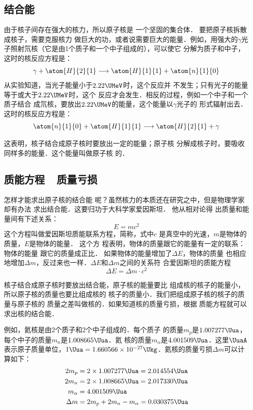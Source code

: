\subsection{结合能}

由于核子间存在强大的核力，所以原子核是
一个坚固的集合体．
要把原子核拆散成核子，需要克服核力
做巨大的功，或者说需要巨大的能量．例如，用强大的$\gamma$光
子照射氘核（它是由1个质子和一个中子组成的），可以使它
分解为质子和中子，这时的核反应方程是：
\[\gamma +\atom{H}{2}{1}\longrightarrow \atom{H}{1}{1}+\atom{n}{1}{0} \]
从实验知道，当光子能量小于$2.22\UMeV$时，这个反应并
不发生；只有光子的能量等于或大于$2.22\UMeV$时，这个
反应才会发生．相反的过程，例如一个中子和一个质子结合
成氘核，要放出$2.22\UMeV$的能量，这个能量以$\gamma$光子的
形式辐射出去．这时的核反应方程是：
\[\atom{n}{1}{0}+ \atom{H}{1}{1}\longrightarrow \atom{H}{2}{1} +\gamma  \]

这表明，核子结合成原子核时要放出一定的能量；原子核
分解成核子时，要吸收同样多的能量．这个能量叫做原子核
的．

\subsection{质能方程~~质量亏损}

怎样才能求出原子核的结合能
呢？虽然核力的本质还在研究之中，但是物理学家却有办法
求出结合能．这要归功于大科学家爱因斯坦．
他从相对论得
出质量和能量间有下述关系：
\[E=mc^2\]
这个方程叫做爱因斯坦质能联系方程，简称，式中$c$
是真空中的光速，$m$是物体的质量，$E$是物体的能量．
这个方
程表明，物体的质量跟它的能量有一定的联系：物体的能量
跟它的质量成正比．
如果物体的能量增加了$\Delta E$，物体的质量
也相应地增加$\Delta m$，反过来也一样．$\Delta E$和$\Delta m$之间的关系符
合爱因斯坦的质能方程
\[\Delta E=\Delta m\cdot c^2\]

核子结合成原子核时要放出结合能，原子核的能量要比
组成核的核子的能量小，所以原子核的质量也要比组成核的
核子的质量小．我们把组成原子核的核子的质量与原子核的
质量之差叫做核的．如果知道核的质量亏损，根据
质能方程就可以求出核的结合能．

例如，氦核是由2个质子和2个中子组成的．每个质子
的质量$m_p$是$1.007277 \Uua$，每个中子的质量$m_n$是$1.008665 \Uua$．氦
核的质量$m_{\alpha}$是$4.001509 \Uua$．这里$\UuaA$表示原子质量单位，$1 \Uua =
1.660566\times10^{-27} \Ukg $．氦核的质量亏损$\Delta m$可以计算如下：
\[\begin{split}
    2m_p&=2\times1.007277\Uua=2.014554\Uua\\
    2m_n&=2\times1.008665\Uua=2.017330\Uua\\
    m_{\alpha}&=4.001509\Uua\\
    \Delta m&=2m_p+2m_n-m_{\alpha}=0.030375\Uua\\
\end{split}\]

